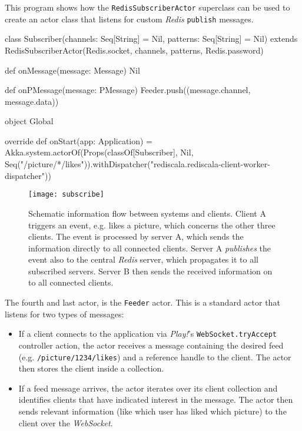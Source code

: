 \begin{program}
  \caption{This program shows how the \texttt{RedisSubscriberActor} superclass can be used to create an actor class that listens for custom \textit{Redis} \texttt{publish} messages.}
  \label{prog:subscriber}
  \begin{JavaCode}
class Subscriber(channels: Seq[String] = Nil, patterns: Seq[String] = Nil) extends RedisSubscriberActor(Redis.socket, channels, patterns, Redis.password) { 
 
    def onMessage(message: Message) {
        Nil
    }

    def onPMessage(message: PMessage) {
        Feeder.push((message.channel, message.data))
    }

}

object Global {

    override def onStart(app: Application) = { 
        Akka.system.actorOf(Props(classOf[Subscriber], Nil, Seq("/picture/*/likes")).withDispatcher("rediscala.rediscala-client-worker-dispatcher"))
    }

}
  \end{JavaCode}
\end{program}

\begin{figure}
\centering\small
\setlength{\tabcolsep}{0mm}
  \texttt{[image: subscribe]}
\caption{
Schematic information flow between systems and clients. Client A triggers an event, e.g. likes a picture, which concerns the other three clients. The event is processed by server A, which sends the information directly to all connected clients. Server A \textit{publishes} the event also to the central \textit{Redis} server, which propagates it to all subscribed servers. Server B then sends the received information on to all connected clients.
}
\label{fig:subscribe}
\end{figure}


The fourth and last actor, is the \texttt{Feeder} actor. This is a standard actor that listens for two types of messages: 
\begin{itemize}
  \item{If a client connects to the application via \textit{Play!}'s \texttt{WebSocket.tryAccept} controller action, the actor receives a message containing the desired feed (e.g. \texttt{/picture/1234/likes}) and a reference handle to the client. The actor then stores the client inside a collection.}
  \item{If a feed message arrives, the actor iterates over its client collection and identifies clients that have indicated interest in the message. The actor then sends relevant information (like which user has liked which picture) to the client over the \textit{WebSocket}.}
\end{itemize}

